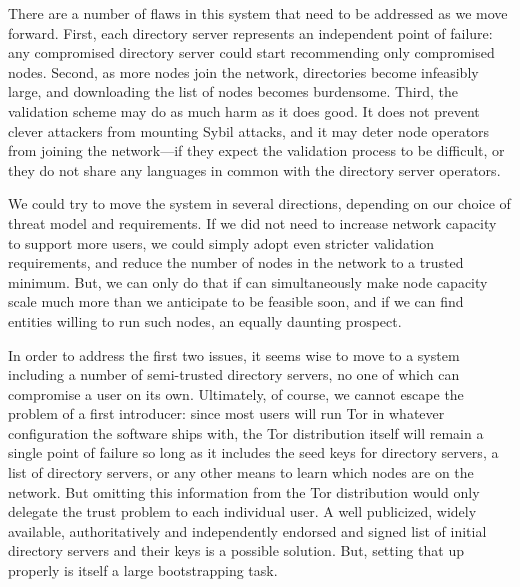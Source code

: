 \documentclass{llncs}
\begin{document}
There are a number of flaws in this system that need to be addressed as we
move forward. First,
each directory server represents an independent point of failure: any
compromised directory server could start recommending only compromised
nodes.
Second, as more nodes join the network, %
directories
become infeasibly large, and downloading the list of nodes becomes
burdensome.
Third, the validation scheme may do as much harm as it does good.  It 
does not prevent clever attackers from mounting Sybil attacks,
and it may deter node operators from joining the network---if
they expect the validation process to be difficult, or they do not share
any languages in common with the directory server operators.

We could try to move the system in several directions, depending on our
choice of threat model and requirements.  If we did not need to increase
network capacity to support more users, we could simply
 adopt even stricter validation requirements, and reduce the number of
nodes in the network to a trusted minimum.  
But, we can only do that if can simultaneously make node capacity
scale much more than we anticipate to be feasible soon, and if we can find
entities willing to run such nodes, an equally daunting prospect.

In order to address the first two issues, it seems wise to move to a system
including a number of semi-trusted directory servers, no one of which can
compromise a user on its own.  Ultimately, of course, we cannot escape the
problem of a first introducer: since most users will run Tor in whatever
configuration the software ships with, the Tor distribution itself will
remain a single point of failure so long as it includes the seed
keys for directory servers, a list of directory servers, or any other means
to learn which nodes are on the network.  But omitting this information
from the Tor distribution would only delegate the trust problem to each
individual user. %
A well publicized, widely available, authoritatively and independently
endorsed and signed list of initial directory servers and their keys
is a possible solution. But, setting that up properly is itself a large 
bootstrapping task.

\end{document}

